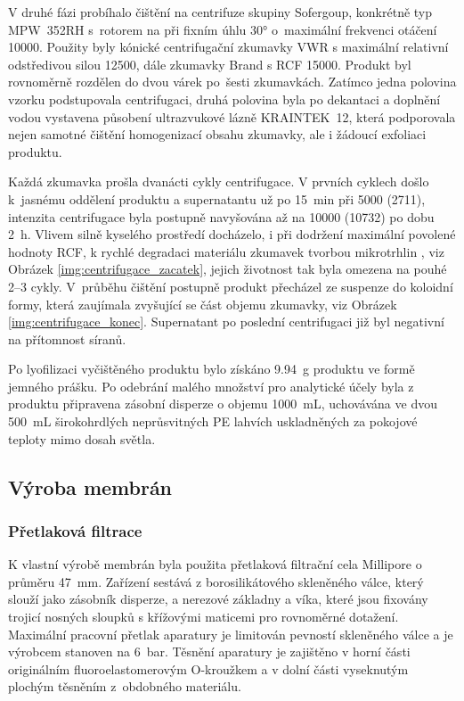 V druhé fázi probíhalo čištění na centrifuze skupiny Sofergoup, konkrétně typ MPW~352RH s~rotorem na  při fixním úhlu \ang{30} o~maximální frekvenci otáčení \qty{10000}{\rpm}. Použity byly kónické centrifugační zkumavky VWR s maximální relativní odstředivou silou  \qty{12500}{\xg}, dále zkumavky Brand s RCF \qty{15000}{\xg}. Produkt byl rovnoměrně rozdělen do dvou várek po~šesti zkumavkách. Zatímco jedna polovina vzorku podstupovala centrifugaci, druhá polovina byla po dekantaci a doplnění vodou vystavena působení ultrazvukové lázně KRAINTEK~12, která podporovala nejen samotné čištění homogenizací obsahu zkumavky, ale i žádoucí exfoliaci produktu. 

Každá zkumavka prošla dvanácti cykly centrifugace. V prvních cyklech došlo k~jasnému oddělení produktu a supernatantu už po \qty{15}{\minute} při \qty{5000}{\rpm} (\qty{2711}{\xg}), intenzita centrifugace byla postupně navyšována až na \qty{10000}{\rpm} (\qty{10732}{\xg}) po dobu \qty{2}{\hour}. Vlivem silně kyselého prostředí docházelo, i při dodržení maximální povolené hodnoty RCF, k rychlé degradaci materiálu zkumavek tvorbou mikrotrhlin , viz Obrázek \ref{img:centrifugace_zacatek}, jejich životnost tak byla omezena na pouhé \numrange{2}{3} cykly. V~průběhu čištění postupně produkt přecházel ze suspenze do koloidní formy, která zaujímala zvyšující se část objemu zkumavky, viz Obrázek \ref{img:centrifugace_konec}. Supernatant po poslední centrifugaci již byl negativní na přítomnost síranů.

Po lyofilizaci vyčištěného produktu bylo získáno \qty{9.94}{\gram} produktu ve formě jemného prášku. Po odebrání malého množství pro analytické účely byla z produktu připravena zásobní disperze o objemu \qty{1000}{\milli\liter}, uchovávána ve dvou \qty{500}{\milli\liter} širokohrdlých neprůsvitných PE lahvích uskladněných za pokojové teploty mimo dosah světla.

\subsection{Výroba membrán}\label{ss:vyroba_membran}
\subsubsection{Přetlaková filtrace}
K vlastní výrobě membrán byla použita přetlaková filtrační cela Millipore  o průměru \qty{47}{\milli\meter}. Zařízení sestává z borosilikátového skleněného válce, který slouží jako zásobník disperze, a nerezové základny a víka, které jsou fixovány trojicí nosných sloupků s křížovými maticemi pro rovnoměrné dotažení. Maximální pracovní přetlak aparatury je limitován pevností skleněného válce a je výrobcem stanoven na \qty{6}{\bar}. Těsnění aparatury je zajištěno v horní části originálním fluoroelastomerovým O-kroužkem a v dolní části vyseknutým plochým těsněním z~obdobného materiálu.

